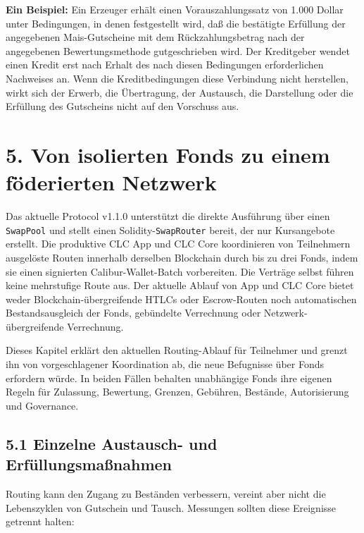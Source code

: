 \documentclass[11pt]{article}
\begin{document}
\textbf{Ein Beispiel:} Ein Erzeuger erhält einen Vorauszahlungssatz von 1.000 Dollar unter Bedingungen, in denen festgestellt wird, daß die bestätigte Erfüllung der angegebenen Mais-Gutscheine mit dem Rückzahlungsbetrag nach der angegebenen Bewertungsmethode gutgeschrieben wird. Der Kreditgeber wendet einen Kredit erst nach Erhalt des nach diesen Bedingungen erforderlichen Nachweises an. Wenn die Kreditbedingungen diese Verbindung nicht herstellen, wirkt sich der Erwerb, die Übertragung, der Austausch, die Darstellung oder die Erfüllung des Gutscheins nicht auf den Vorschuss aus.


\section*{5. Von isolierten Fonds zu einem föderierten Netzwerk}

Das aktuelle Protocol v1.1.0 unterstützt die direkte Ausführung über einen \texttt{SwapPool} und stellt einen Solidity-\texttt{SwapRouter} bereit, der nur Kursangebote erstellt. Die produktive CLC App und CLC Core koordinieren von Teilnehmern ausgelöste Routen innerhalb derselben Blockchain durch bis zu drei Fonds, indem sie einen signierten Calibur-Wallet-Batch vorbereiten. Die Verträge selbst führen keine mehrstufige Route aus. Der aktuelle Ablauf von App und CLC Core bietet weder Blockchain-übergreifende HTLCs oder Escrow-Routen noch automatischen Bestandsausgleich der Fonds, gebündelte Verrechnung oder Netzwerk-übergreifende Verrechnung.

Dieses Kapitel erklärt den aktuellen Routing-Ablauf für Teilnehmer und grenzt ihn von vorgeschlagener Koordination ab, die neue Befugnisse über Fonds erfordern würde. In beiden Fällen behalten unabhängige Fonds ihre eigenen Regeln für Zulassung, Bewertung, Grenzen, Gebühren, Bestände, Autorisierung und Governance.

\subsection*{5.1 Einzelne Austausch- und Erfüllungsmaßnahmen}

Routing kann den Zugang zu Beständen verbessern, vereint aber nicht die Lebenszyklen von Gutschein und Tausch. Messungen sollten diese Ereignisse getrennt halten:
\end{document}
